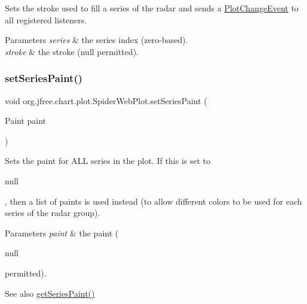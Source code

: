 Sets the stroke used to fill a series of the radar and sends a \mbox{\hyperlink{}{Plot\+Change\+Event}} to all registered listeners.


\begin{DoxyParams}{Parameters}
{\em series} & the series index (zero-\/based). \\
\hline
{\em stroke} & the stroke ({\ttfamily null} permitted). \\
\hline
\end{DoxyParams}
\mbox{\label{classorg_1_1jfree_1_1chart_1_1plot_1_1_spider_web_plot_ada5fa71ef3e684aeeadd43027093c47a}} 
\subsubsection{\texorpdfstring{set\+Series\+Paint()}{setSeriesPaint()}\hspace{0.1cm}{\footnotesize\ttfamily [1/2]}}
{\footnotesize\ttfamily void org.\+jfree.\+chart.\+plot.\+Spider\+Web\+Plot.\+set\+Series\+Paint (\begin{DoxyParamCaption}\item[{Paint}]{paint }\end{DoxyParamCaption})}

Sets the paint for A\+LL series in the plot. If this is set to 
\begin{DoxyCode}
null 
\end{DoxyCode}
 , then a list of paints is used instead (to allow different colors to be used for each series of the radar group).


\begin{DoxyParams}{Parameters}
{\em paint} & the paint (
\begin{DoxyCode}
null 
\end{DoxyCode}
 permitted).\\
\hline
\end{DoxyParams}
\begin{DoxySeeAlso}{See also}
\mbox{\hyperlink{classorg_1_1jfree_1_1chart_1_1plot_1_1_spider_web_plot_a55ac552ac5f9a7f6101abcf71140e61c}{get\+Series\+Paint()}} 
\end{DoxySeeAlso}
\mbox{\label{classorg_1_1jfree_1_1chart_1_1plot_1_1_spider_web_plot_af6e4b9783a9e1cb17decded263b28166}} 
